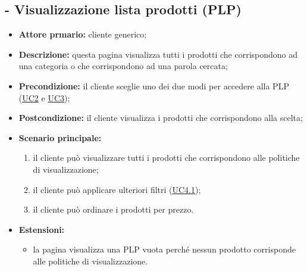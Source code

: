 \subsection{ - Visualizzazione lista prodotti (PLP)}
\begin{itemize}
    \item \textbf{Attore prmario:} cliente generico;
    \item \textbf{Descrizione:} questa pagina visualizza tutti i prodotti che corrispondono ad una categoria o che corrispondono ad una parola cercata;
    \item \textbf{Precondizione:} il cliente sceglie uno dei due modi per accedere alla PLP (\hyperref[UC2]{UC2} e \hyperref[UC3]{UC3});
    \item \textbf{Postcondizione:} il cliente visualizza i prodotti che corrispondono alla scelta;
    \item \textbf{Scenario principale:}
          \begin{enumerate}
              \item il cliente può visualizzare tutti i prodotti che corrispondono alle politiche di visualizzazione;
              \item il cliente può applicare ulteriori filtri (\hyperref[UC4.1]{UC4.1});
              \item il cliente può ordinare i prodotti per prezzo.
          \end{enumerate}
    \item \textbf{Estensioni:}
          \begin{itemize}
              \item la pagina visualizza una PLP vuota perché nessun prodotto corrisponde alle politiche di visualizzazione.
          \end{itemize}
\end{itemize}

\stepsubUserCase
